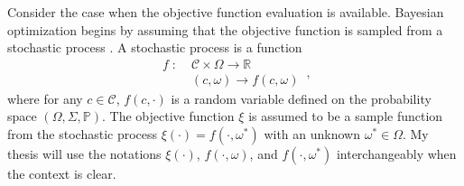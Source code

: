 Consider the case when the objective function evaluation is available.
Bayesian optimization begins by assuming that the objective function is sampled
from a stochastic process \cite{practical Bayesian, review EI, jones1998}. 
A stochastic process is a function
\begin{equation}\begin{split}
    f \; :\; & \mathcal{C} \times \Omega \rightarrow \mathbb{R}\\
         & (c, \omega) \rightarrow f(c,\omega)
\end{split}\,,\label{stochastic process}
\end{equation}
where for any $c\in \mathcal{C}$, $f(c, \cdot)$ is a random variable defined 
on the probability space $(\Omega, \Sigma, \mathbb{P})$. 
The objective function $\xi$ is assumed to be a sample function from the stochastic process
$\xi(\cdot) = f(\cdot, \omega^*)$ with an unknown $\omega^* \in \Omega$.
My thesis will use the notations $\xi(\cdot)$, $f(\cdot, \omega)$, and $f(\cdot, \omega^*)$ 
interchangeably when the context is clear.\\

